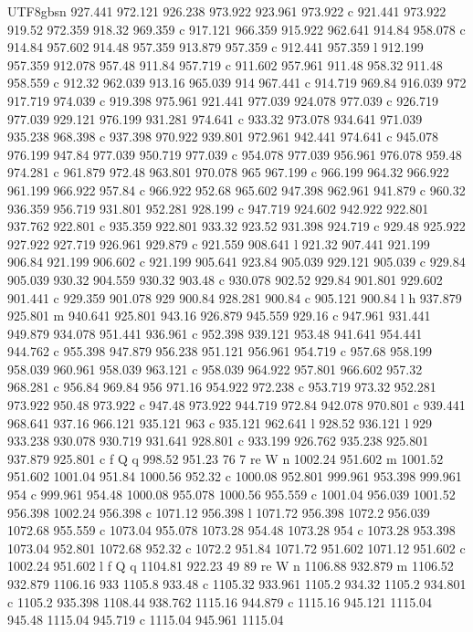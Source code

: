 \documentclass[11pt,a4paper,oneside]{report}
\begin{document}
\begin{CJK*}{UTF8}{gbsn}
{927.441 972.121 926.238 973.922 923.961 973.922 c 921.441 973.922 919.52 972.359 918.32 969.359 c 917.121
966.359 915.922 962.641 914.84 958.078 c 914.84 957.602 914.48 957.359 913.879 957.359 c 912.441 957.359
l 912.199 957.359 912.078 957.48 911.84 957.719 c 911.602 957.961 911.48 958.32 911.48 958.559 c 912.32
962.039 913.16 965.039 914 967.441 c 914.719 969.84 916.039 972 917.719 974.039 c 919.398 975.961 921.441
977.039 924.078 977.039 c 926.719 977.039 929.121 976.199 931.281 974.641 c 933.32 973.078 934.641
971.039 935.238 968.398 c 937.398 970.922 939.801 972.961 942.441 974.641 c 945.078 976.199 947.84
977.039 950.719 977.039 c 954.078 977.039 956.961 976.078 959.48 974.281 c 961.879 972.48 963.801 970.078
965 967.199 c 966.199 964.32 966.922 961.199 966.922 957.84 c 966.922 952.68 965.602 947.398 962.961
941.879 c 960.32 936.359 956.719 931.801 952.281 928.199 c 947.719 924.602 942.922 922.801 937.762
922.801 c 935.359 922.801 933.32 923.52 931.398 924.719 c 929.48 925.922 927.922 927.719 926.961 929.879
c 921.559 908.641 l 921.32 907.441 921.199 906.84 921.199 906.602 c 921.199 905.641 923.84 905.039
929.121 905.039 c 929.84 905.039 930.32 904.559 930.32 903.48 c 930.078 902.52 929.84 901.801 929.602
901.441 c 929.359 901.078 929 900.84 928.281 900.84 c 905.121 900.84 l h 937.879 925.801 m 940.641
925.801 943.16 926.879 945.559 929.16 c 947.961 931.441 949.879 934.078 951.441 936.961 c 952.398 939.121
953.48 941.641 954.441 944.762 c 955.398 947.879 956.238 951.121 956.961 954.719 c 957.68 958.199 958.039
960.961 958.039 963.121 c 958.039 964.922 957.801 966.602 957.32 968.281 c 956.84 969.84 956 971.16
954.922 972.238 c 953.719 973.32 952.281 973.922 950.48 973.922 c 947.48 973.922 944.719 972.84 942.078
970.801 c 939.441 968.641 937.16 966.121 935.121 963 c 935.121 962.641 l 928.52 936.121 l 929 933.238
930.078 930.719 931.641 928.801 c 933.199 926.762 935.238 925.801 937.879 925.801 c f Q q 998.52 951.23
76 7 re W n 1002.24 951.602 m 1001.52 951.602 1001.04 951.84 1000.56 952.32 c 1000.08 952.801 999.961
953.398 999.961 954 c 999.961 954.48 1000.08 955.078 1000.56 955.559 c 1001.04 956.039 1001.52 956.398
1002.24 956.398 c 1071.12 956.398 l 1071.72 956.398 1072.2 956.039 1072.68 955.559 c 1073.04 955.078
1073.28 954.48 1073.28 954 c 1073.28 953.398 1073.04 952.801 1072.68 952.32 c 1072.2 951.84 1071.72
951.602 1071.12 951.602 c 1002.24 951.602 l f Q q 1104.81 922.23 49 89 re W n 1106.88 932.879 m 1106.52
932.879 1106.16 933 1105.8 933.48 c 1105.32 933.961 1105.2 934.32 1105.2 934.801 c 1105.2 935.398 1108.44
938.762 1115.16 944.879 c 1115.16 945.121 1115.04 945.48 1115.04 945.719 c 1115.04 945.961 1115.04
}
\end{CJK*}
\end{document}
